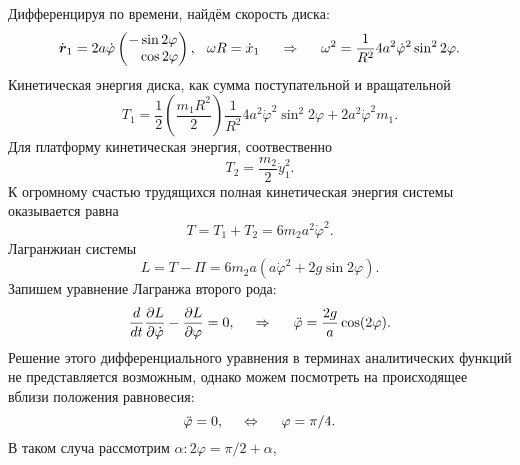 Дифференцируя по времени, найдём скорость диска:
\begin{equation*}
    \dot{\mbox{\boldmath $r$}}_1 = 2 a \dot{\varphi} \begin{pmatrix}
        - \sin 2 \varphi \\
        \phantom{-} \cos 2 \varphi
    \end{pmatrix}, \hspace{0.25cm} 
    \omega R = \dot{x}_1
    \hspace{0.5cm} \Rightarrow \hspace{0.5cm} 
    \omega^2 = \frac{1}{R^2} 4 a^2 \dot{\varphi}^2 \sin^2 2 \varphi.
\end{equation*}
Кинетическая энергия диска, как сумма поступательной и вращательной
\begin{equation*}
    T_1 = \frac{1}{2} \left(\frac{m_1 R^2}{2} \right) \frac{1}{R^2} 4 a^2 \dot{\varphi}^2 \sin^2 2 \varphi + 2 a^2 \dot{\varphi}^2 m_1.
\end{equation*}
Для платформу кинетическая энергия, соотвественно
\begin{equation*}
    T_2 = \frac{m_2}{2} \dot{y}_1^2.
\end{equation*}
К огромному счастью трудящихся полная кинетическая энергия системы оказывается равна
\begin{equation*}
    T = T_1 + T_2 = 6 m_2 a^2 \dot{\varphi}^2.
\end{equation*}
Лагранжиан системы
\begin{equation}
    L = T - \Pi = 6m_2 a\left(
        a \dot{\varphi}^2 + 2 g \sin 2 \varphi
    \right).
\end{equation}
Запишем уравнение Лагранжа второго рода:
\begin{equation}
    \frac{d}{dt} \frac{\partial L}{\partial \dot{\varphi}} - \frac{\partial L}{\partial \varphi} = 0, \hspace{0.5cm} \Rightarrow \hspace{0.5cm} 
    \ddot{\varphi} = \frac{2g}{a} \cos (2 \varphi).
\end{equation}
Решение этого дифференциального уравнения в терминах аналитических функций не представляется возможным, однако можем посмотреть на происходящее вблизи положения равновесия:
\begin{equation*}
    \ddot{\varphi} = 0, \hspace{0.5cm} \Leftrightarrow \hspace{0.5cm} 
    \varphi = \pi / 4.
\end{equation*}
В таком случа рассмотрим $\alpha \colon 2 \varphi = \pi/2 + \alpha$,

